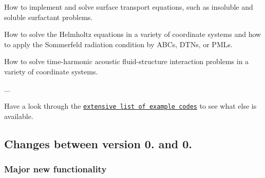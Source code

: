 \begin{DoxyItemize}
\begin{DoxyItemize}
\item How to implement and solve surface transport equations, such as insoluble and soluble surfactant problems. ~\newline
~\newline

\item How to solve the Helmholtz equations in a variety of coordinate systems and how to apply the Sommerfeld radiation condition by A\+B\+Cs, D\+T\+Ns, or P\+M\+Ls. ~\newline
~\newline

\item How to solve time-\/harmonic acoustic fluid-\/structure interaction problems in a variety of coordinate systems. ~\newline
~\newline

\item ...~\newline
~\newline

\end{DoxyItemize}
\end{DoxyItemize}Have a look through the \href{../../example_code_list/html/index.html}{\tt extensive list of example codes} to see what else is available. \hypertarget{index_zero_point_eight_five_to_zero_point_nine}{}\subsection{Changes between version 0. and 0.}\label{index_zero_point_eight_five_to_zero_point_nine}
\hypertarget{index_new_functionality_zero_point_nine}{}\subsubsection{Major new functionality}\label{index_new_functionality_zero_point_nine}

